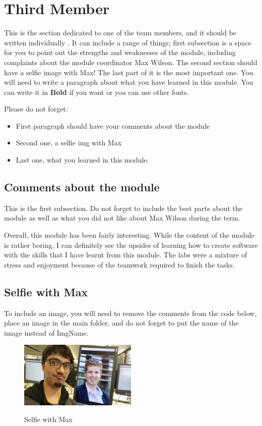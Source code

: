 \section{Third Member}
This is the section dedicated to one of the team members, and it should be written individually . It can include a range of things; first subsection is a space for you to point out the strengths and weaknesses of the module, including complaints about the module coordinator Max Wilson. The second section should have a selfie image with Max! The last part of it is the most important one. You will need to write a paragraph about what you have learned in this module. You can write it in \textbf{Bold} if you want or you can use other fonts. 

Please do not forget:
\begin{itemize}
	\item First paragraph should have your comments about the module
	\item Second one, a selfie img with Max
	\item Last one, what you learned in this module.
\end{itemize}

\subsection{Comments about the module}
This is the first subsection. Do not forget to include the best parts about the module as well as what you did not like about Max Wilson during the term.

Overall, this module has been fairly interesting. While the content of the module is rather boring, I can definitely see the upsides of learning how to create software with the skills that I have learnt from this module. The labs were a mixture of stress and enjoyment because of the teamwork required to finish the tasks. 

\subsection{Selfie with Max}

To include an image, you will need to remove the comments from the code below, place an image in the main folder, and do not forget to put the name of the image instead of ImgName. 

\begin{figure}[h]
\caption{Selfie with Max}
\centering
\includegraphics[width=0.5\textwidth]{psyjk4selfie}
\label{fig:selfie}
\end{figure}

